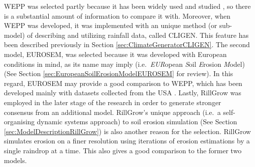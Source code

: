 WEPP was selected partly because it has been widely used and studied
\citep{zhang1996-855,baffaut1998-756,favis-mortlock1999-329,pruski2002-climate,
pruski2002-7,flanagan2007-1603}, so there is a substantial amount of
information to compare it with. Moreover, when WEPP was developed, it was
implemented with an unique method (or sub-model) of describing and utilizing
rainfall data, called CLIGEN. This feature has been described previously in
Section \ref{sec:ClimateGeneratorCLIGEN}. The second model, EUROSEM, was
selected because it was developed with European conditions in mind, as its name
may imply (i.e.\ \emph{EUR}opean \emph{S}oil \emph{E}rosion \emph{M}odel) (See
Section \ref{sec:EuropeanSoilErosionModelEUROSEM} for review). In this regard,
EUROSEM may provide a good comparison to WEPP, which has been developed mainly
with datasets collected from the USA \citep{flanagan2007-1603}. Lastly, RillGrow
was employed in the later stage of the research in order to generate stronger
consensus from an additional model. RillGrow's unique approach (i.e.\ a
self-organising dynamic systems approach) to soil erosion simulation (See
Section \ref{sec:ModelDescriptionRillGrow}) is also another reason for the
selection. RillGrow simulates erosion on a finer resolution using iterations of
erosion estimations by a single raindrop at a time. This also gives a good
comparison to the former two models.


